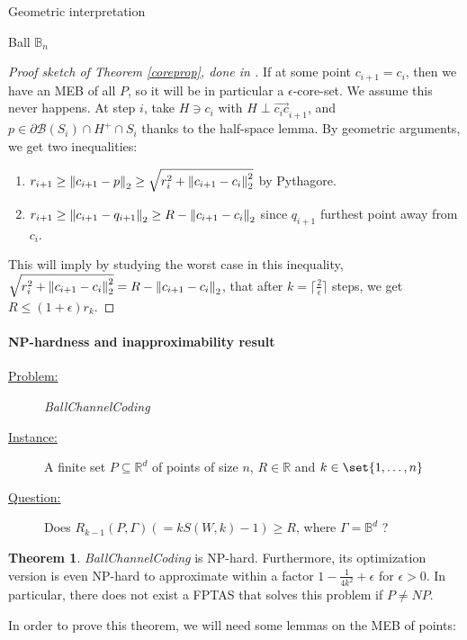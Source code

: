 \documentclass{article}
\theoremstyle{definition}
\newtheorem{theo}{Theorem}[section]
\theoremstyle{remark}
\begin{document}
\begin{subsection}{Geometric interpretation}
\begin{subsubsection}{Ball $\mathbb{B}_n$}
  \begin{proof}[Proof sketch of Theorem \ref{coreprop}, done in \cite{BK03}]
    If at some point $c_{i+1} = c_i$, then we have an MEB of all $P$, so it will be in particular a $\epsilon$-core-set. We assume this never happens. At step $i$, take $H \ni c_i$ with $H \perp \overset{\rightarrow}{c_ic}_{i+1}$, and $p \in \partial\mathcal{B}(S_i) \cap H^+ \cap S_i$ thanks to the half-space lemma. By geometric arguments, we get two inequalities:
    \begin{enumerate}
      \item $r_{i+1} \geq \norm{c_{i+1}-p}_2 \geq \sqrt{r_i^2+\norm{c_{i+1}-c_i}_2^2}$ by Pythagore.
      \item $r_{i+1} \geq \norm{c_{i+1}-q_{i+1}}_2 \geq R - \norm{c_{i+1}-c_i}_2$ since $q_{i+1}$ furthest point away from $c_i$.
    \end{enumerate}
    
    This will imply by studying the worst case in this inequality, $\sqrt{r_i^2+\norm{c_{i+1}-c_i}_2^2} = R - \norm{c_{i+1}-c_i}_2$, that after $k = \lceil\frac{2}{\epsilon}\rceil$ steps, we get $R \leq (1+\epsilon)r_k$.
  \end{proof}
  
  \paragraph{NP-hardness and inapproximability result}
  \begin{description}
  \item[\underline{Problem:}] \emph{BallChannelCoding}
  \item[\underline{Instance:}] A finite set $P \subseteq \mathbb{R}^d$ of points of size $n$, $R \in \mathbb{R}$ and $k \in \set{1,\ldots,n}$
  \item[\underline{Question:}] Does $R_{k-1}(P,\Gamma) (=kS(W,k)-1) \geq R$, where $\Gamma = \mathbb{B}^d$ ?
  \end{description}

  \begin{theo}
    \label{theoBallChannelCoding}
    \emph{BallChannelCoding} is NP-hard. Furthermore, its optimization version is even NP-hard to approximate within a factor $1 - \frac{1}{4k^2} + \epsilon$ for $\epsilon > 0$. In particular, there does not exist a FPTAS that solves this problem if $P \not= NP$.
  \end{theo}

  In order to prove this theorem, we will need some lemmas on the MEB of points:


\end{subsubsection}
\end{subsection}
\end{document}
